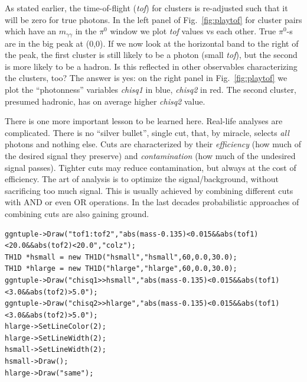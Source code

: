 \documentclass[12pt,letterpaper,aps,prc,superscriptaddress,showpacs,
longbibliography,nofootinbib,floatfix,onecolumn]{revtex4-1}
\newcommand{\piz}{\mbox{$\pi^0$}\xspace}
\newcommand{\mgg}{\mbox{$m_{\gamma\gamma}$}\xspace}
\begin{document}
As stated earlier, the time-of-flight ({\it tof}) for clusters is
re-adjusted such that it will be zero for true photons.  In the left
panel of Fig.~\ref{fig:playtof} for cluster pairs which have an \mgg
in the \piz window we plot {\it tof} values vs each other.  True
\piz-s are in the big peak at (0,0).  If we now look at the horizontal
band to the right of the peak, the first cluster is still likely to be
a photon (small {\it tof}), but the second is more likely to be a
hadron.  Is this reflected in other observables characterizing the
clusters, too?  The answer is yes: on the right panel in
Fig.~\ref{fig:playtof} we plot the ``photonness'' variables 
{\it chisq1} in blue, {\it chisq2} in red.  The second cluster,
presumed hadronic, has on average higher {\it chisq2} value.

There is one more important lesson to be learned here.  Real-life
analyses are complicated.  There is no ``silver bullet'', single cut,
that, by miracle, selects {\it all} photons and nothing else.
Cuts are characterized by their {\it efficiency} (how much of the
desired signal they preserve) and {\it contamination} (how much of the
undesired signal passes).  Tighter cuts may reduce contamination, but
always at the cost of efficiency.  The art of analysis is to optimize
the signal/background, without sacrificing too much signal.
This is usually achieved by combining different cuts with AND or even
OR operations.  In the last decades probabilistic approaches of
combining cuts are also gaining ground.


\begin{verbatim}
ggntuple->Draw("tof1:tof2","abs(mass-0.135)<0.015&&abs(tof1)<20.0&&abs(tof2)<20.0","colz");
TH1D *hsmall = new TH1D("hsmall","hsmall",60,0.0,30.0);
TH1D *hlarge = new TH1D("hlarge","hlarge",60,0.0,30.0);
ggntuple->Draw("chisq1>>hsmall","abs(mass-0.135)<0.015&&abs(tof1)<3.0&&abs(tof2)>5.0");
ggntuple->Draw("chisq2>>hlarge","abs(mass-0.135)<0.015&&abs(tof1)<3.0&&abs(tof2)>5.0");
hlarge->SetLineColor(2);
hlarge->SetLineWidth(2);
hsmall->SetLineWidth(2);
hsmall->Draw();
hlarge->Draw("same");
\end{verbatim}
\end{document}
